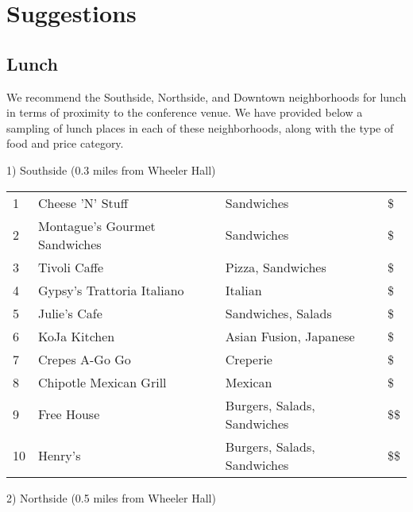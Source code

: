 \chapter{Suggestions}

\setlength\fboxsep{0pt}
\setlength\fboxrule{0.5pt}

\vspace{-1.5cm}
 \section{Lunch}

We recommend the Southside, Northside, and Downtown neighborhoods for lunch in terms of proximity to the conference venue. We have provided below a sampling of lunch places in each of these neighborhoods, along with the type of food and price category. 

\vspace{1mm}

1) Southside (0.3 miles from Wheeler Hall)

\begingroup
\small
\begin{multicols}{1}[]
    \begin{tabular}{p{0.3cm} p{4cm} p{5cm} p{0.5cm}}
        1 & Cheese 'N' Stuff & Sandwiches & \$\\
        2 & Montague's Gourmet Sandwiches & Sandwiches & \$\\
        3 & Tivoli Caffe & Pizza, Sandwiches & \$\\
        4 & Gypsy's Trattoria Italiano & Italian  & \$\\
        5 & Julie's Cafe & Sandwiches, Salads & \$\\ 
        6 & KoJa Kitchen & Asian Fusion, Japanese & \$\\
        7 & Crepes A-Go Go & Creperie & \$\\
        8 & Chipotle Mexican Grill & Mexican & \$\\
        9 & Free House & Burgers, Salads, Sandwiches & \$\$\\
        10 & Henry's & Burgers, Salads, Sandwiches & \$\$\\
    \end{tabular}
\end{multicols}
\endgroup
\normalsize 

2) Northside (0.5 miles from Wheeler Hall)

